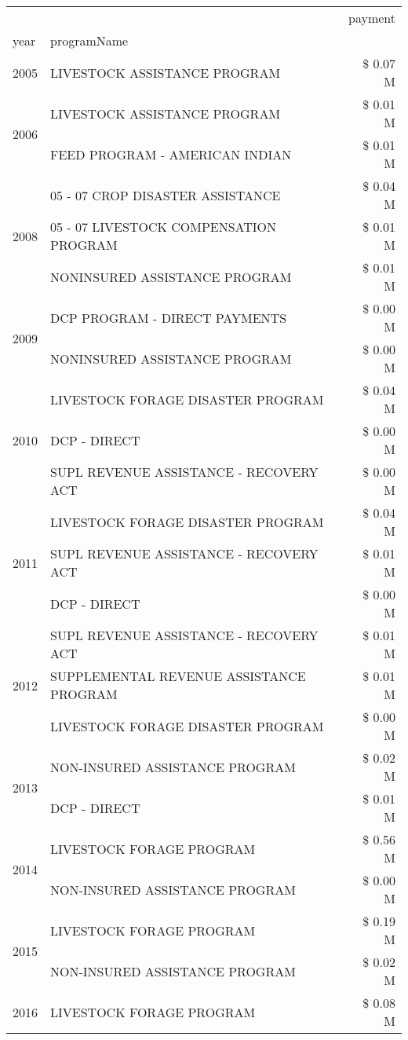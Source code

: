 \begin{tabular}{llr}
\toprule
 &  & payment \\
year & programName &  \\
\midrule
2005 & LIVESTOCK ASSISTANCE PROGRAM & \$ 0.07 M \\
\cline{1-3}
\multirow[t]{2}{*}{2006} & LIVESTOCK ASSISTANCE PROGRAM & \$ 0.01 M \\
 & FEED PROGRAM - AMERICAN INDIAN & \$ 0.01 M \\
\cline{1-3}
\multirow[t]{3}{*}{2008} & 05 - 07 CROP DISASTER ASSISTANCE & \$ 0.04 M \\
 & 05 - 07 LIVESTOCK COMPENSATION PROGRAM & \$ 0.01 M \\
 & NONINSURED ASSISTANCE PROGRAM & \$ 0.01 M \\
\cline{1-3}
\multirow[t]{2}{*}{2009} & DCP PROGRAM - DIRECT PAYMENTS & \$ 0.00 M \\
 & NONINSURED ASSISTANCE PROGRAM & \$ 0.00 M \\
\cline{1-3}
\multirow[t]{3}{*}{2010} & LIVESTOCK FORAGE DISASTER PROGRAM & \$ 0.04 M \\
 & DCP - DIRECT & \$ 0.00 M \\
 & SUPL REVENUE ASSISTANCE - RECOVERY ACT & \$ 0.00 M \\
\cline{1-3}
\multirow[t]{3}{*}{2011} & LIVESTOCK FORAGE DISASTER PROGRAM & \$ 0.04 M \\
 & SUPL REVENUE ASSISTANCE - RECOVERY ACT & \$ 0.01 M \\
 & DCP - DIRECT & \$ 0.00 M \\
\cline{1-3}
\multirow[t]{3}{*}{2012} & SUPL REVENUE ASSISTANCE - RECOVERY ACT & \$ 0.01 M \\
 & SUPPLEMENTAL REVENUE ASSISTANCE PROGRAM & \$ 0.01 M \\
 & LIVESTOCK FORAGE DISASTER PROGRAM & \$ 0.00 M \\
\cline{1-3}
\multirow[t]{2}{*}{2013} & NON-INSURED ASSISTANCE PROGRAM & \$ 0.02 M \\
 & DCP - DIRECT & \$ 0.01 M \\
\cline{1-3}
\multirow[t]{2}{*}{2014} & LIVESTOCK FORAGE PROGRAM & \$ 0.56 M \\
 & NON-INSURED ASSISTANCE PROGRAM & \$ 0.00 M \\
\cline{1-3}
\multirow[t]{2}{*}{2015} & LIVESTOCK FORAGE PROGRAM & \$ 0.19 M \\
 & NON-INSURED ASSISTANCE PROGRAM & \$ 0.02 M \\
\cline{1-3}
\multirow[t]{2}{*}{2016} & LIVESTOCK FORAGE PROGRAM & \$ 0.08 M \\

\end{tabular}
